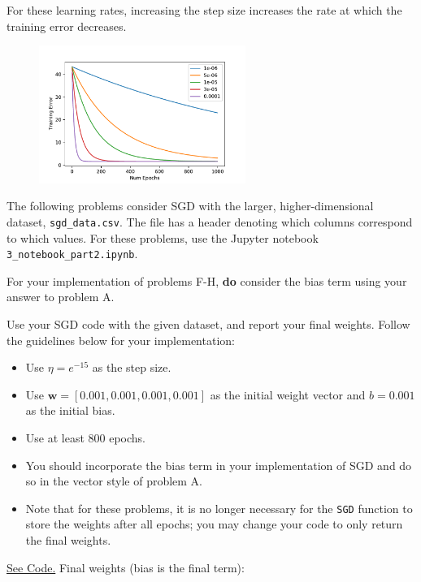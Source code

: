\begin{solution}
  For these learning rates, increasing the step size increases the rate at which the training error decreases.
  \begin{figure}[H]
    \centering
    \includegraphics[width=0.6\textwidth]{images/fig2.pdf}
  \end{figure}
\end{solution}


The following problems consider SGD with the larger, higher-dimensional dataset, \texttt{sgd_data.csv}. The file has a header denoting which columns correspond to which values. For these problems, use the Jupyter notebook \texttt{3_notebook_part2.ipynb}.

For your implementation of problems F-H, \textbf{do} consider the bias term using your answer to problem A.

\begin{problem}[6]
  Use your SGD code with the given dataset, and report your final weights. Follow the guidelines below for your implementation:

  \begin{itemize}
    \item Use $\eta = e^{-15}$ as the step size.  
    \item Use $\mathbf{w} = [0.001, 0.001, 0.001, 0.001]$ as the initial weight vector and $b = 0.001$ as the initial bias.
    \item Use at least 800 epochs.
    \item You should incorporate the bias term in your implementation of SGD and do so in the vector style of problem A.
    \item Note that for these problems, it is no longer necessary for the \texttt{SGD} function to store the weights after all epochs; you may change your code to only return the final weights.
  \end{itemize}
\end{problem}
\begin{solution}
  \href{https://colab.research.google.com/drive/1tO16dhnkFc3v7Ne1p6tDCoEdw2z4Rttj?usp=sharing}{See Code.} Final weights (bias is the final term): \newline
  [ -5.94229011,   3.94369494, -11.72402388,   8.78549375, -0.22720591]
\end{solution}

